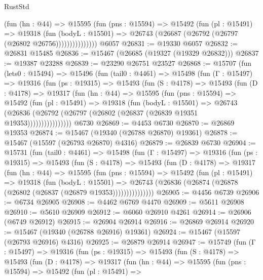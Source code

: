 \begin{lexlean}{RustStd}
\begin{coremodule}
                  (fun (hn : @44) =>
                  @15595
                    (fun (pns : @15594) =>
                    @15492
                      (fun (pl : @15491) =>
                      @19318
                        (fun (bodyL : @15501) =>
                        @26743 (@26687 (@26792 (@26797 (@26802 @26756)))))))))))))))
    @6057
@26831 := @19330 @6057
@26832 := @26831 @15485
@26836 := @15467 (@26685 (@19327 (@19329 @26832)))
@26837 := @19387 @23288
@26839 := @23290 @26751 @23527
@26868 := @15707
    (fun (lets0 : @15494) =>
    @15496
      (fun (tail0 : @4461) =>
      @15498
        (fun (Γ : @15497) =>
        @19316
          (fun (ps : @19315) =>
          @15493
            (fun (S : @4178) =>
            @15493
              (fun (D : @4178) =>
              @19317
                (fun (hn : @44) =>
                @15595
                  (fun (pns : @15594) =>
                  @15492
                    (fun (pl : @15491) =>
                    @19318
                      (fun (bodyL : @15501) =>
                      @26743
                        (@26836
                          (@26792 (@26797 (@26802 (@26837 (@26839 @19351 @19353))))))))))))))))
    @6730
@26869 := @4453 @6730
@26870 := @26869 @19353
@26874 := @15467 (@19340 (@26788 @26870) @19361)
@26878 := @15467 (@15597 (@26793 @26870) @4316)
@26879 := @26839 @6730
@26904 := @15731
    (fun (tail0 : @4461) =>
    @15498
      (fun (Γ : @15497) =>
      @19316
        (fun (ps : @19315) =>
        @15493
          (fun (S : @4178) =>
          @15493
            (fun (D : @4178) =>
            @19317
              (fun (hn : @44) =>
              @15595
                (fun (pns : @15594) =>
                @15492
                  (fun (pl : @15491) =>
                  @19318
                    (fun (bodyL : @15501) =>
                    @26743 (@26836 (@26874 (@26878 (@26802 (@26837 (@26879 @19353)))))))))))))))
@26905 := @4456 @6739
@26906 := @6734 @26905
@26908 := @4462 @6769 @4470
@26909 := @5611 @26908
@26910 := @5610 @26909
@26912 := @6060 @26910 @4261
@26914 := @26906 (@6749 @26912)
@26915 := @26904 @26914
@26916 := @26869 @26914
@26920 := @15467 (@19340 (@26788 @26916) @19361)
@26924 := @15467 (@15597 (@26793 @26916) @4316)
@26925 := @26879 @26914
@26947 := @15749
    (fun (Γ : @15497) =>
    @19316
      (fun (ps : @19315) =>
      @15493
        (fun (S : @4178) =>
        @15493
          (fun (D : @4178) =>
          @19317
            (fun (hn : @44) =>
            @15595
              (fun (pns : @15594) =>
              @15492
                (fun (pl : @15491) =>

\end{coremodule}
\end{lexlean}
